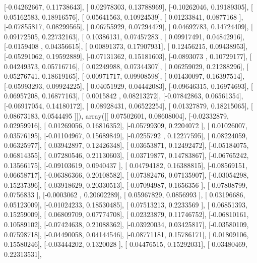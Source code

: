 \documentclass{article}
\begin{document}
       [-0.04262667,  0.11738643],
       [ 0.02978303,  0.13788969],
       [-0.10262046,  0.19189305],
       [ 0.05162583,  0.18916576],
       [ 0.05641563,  0.10924539],
       [ 0.01233841,  0.0877168 ],
       [-0.07855817,  0.08299565],
       [ 0.06755929,  0.07294479],
       [ 0.04692783,  0.14724409],
       [ 0.09172505,  0.22732163],
       [ 0.10386131,  0.07457283],
       [ 0.09917491,  0.04842916],
       [-0.0159408 ,  0.04356615],
       [ 0.00891373,  0.17907931],
       [ 0.12456215,  0.09438953],
       [-0.05291062,  0.19592889],
       [-0.07131362,  0.15181603],
       [-0.0893073 ,  0.10729177],
       [ 0.04249373,  0.05716716],
       [ 0.02249988,  0.07344307],
       [ 0.06259029,  0.21288296],
       [ 0.05276741,  0.18619165],
       [-0.00971717,  0.09908598],
       [ 0.01430097,  0.16397514],
       [-0.05993293,  0.09924225],
       [ 0.04051929,  0.04442083],
       [-0.09646315,  0.16974693],
       [ 0.06957208,  0.16877163],
       [ 0.0015842 ,  0.08213272],
       [-0.07842863,  0.06561354],
       [-0.06917054,  0.14180172],
       [ 0.08928431,  0.06522254],
       [ 0.01327879,  0.18215065],
       [ 0.08673183,  0.0544495 ]]), array([[ 0.07502601,  0.08608004],
       [-0.02332879,  0.02959916],
       [ 0.01269056,  0.16816352],
       [-0.05799309,  0.2204072 ],
       [ 0.01026007,  0.03576195],
       [-0.01104967,  0.15689849],
       [-0.0255792 ,  0.12277595],
       [ 0.08224059,  0.06325977],
       [ 0.03942897,  0.12426348],
       [ 0.03653871,  0.12492472],
       [-0.05184075,  0.06814355],
       [ 0.07280546,  0.21130603],
       [ 0.03719877,  0.14783867],
       [-0.06765242,  0.13566175],
       [-0.09103619,  0.0940437 ],
       [ 0.04794182,  0.16388815],
       [-0.08569151,  0.06658717],
       [-0.06386366,  0.20108582],
       [ 0.07382476,  0.07135907],
       [-0.03054298,  0.15237396],
       [-0.03918629,  0.20330513],
       [-0.07094987,  0.1656356 ],
       [-0.07808799,  0.0756833 ],
       [-0.0003062 ,  0.20602289],
       [ 0.05967829,  0.0856993 ],
       [ 0.03196686,  0.05123009],
       [-0.01024233,  0.18530485],
       [ 0.07513213,  0.2233569 ],
       [ 0.06851393,  0.15259009],
       [ 0.06809709,  0.07774708],
       [ 0.02323879,  0.11746752],
       [-0.06810161,  0.10589102],
       [-0.07424638,  0.21088362],
       [-0.03920034,  0.03425817],
       [-0.03580109,  0.07598718],
       [-0.04490058,  0.04144546],
       [-0.08771181,  0.15786171],
       [ 0.01809106,  0.15580246],
       [-0.03444202,  0.1320028 ],
       [ 0.04476515,  0.15292031],
       [ 0.03480469,  0.22313531],
\end{document}
